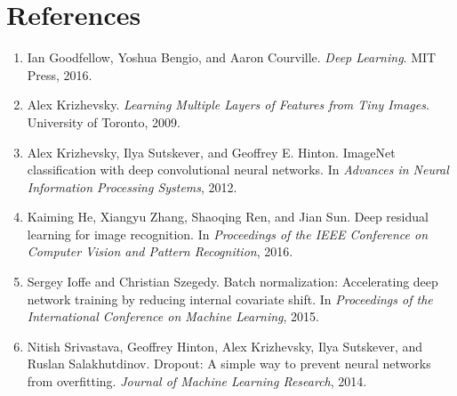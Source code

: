 \documentclass{article}
\begin{document}
\section*{References}

\begin{enumerate}
    \item Ian Goodfellow, Yoshua Bengio, and Aaron Courville. \emph{Deep Learning}. MIT Press, 2016.
    \item Alex Krizhevsky. \textit{Learning Multiple Layers of Features from Tiny Images}. University of Toronto, 2009.
    \item Alex Krizhevsky, Ilya Sutskever, and Geoffrey E. Hinton. ImageNet classification with deep convolutional neural networks. In \textit{Advances in Neural Information Processing Systems}, 2012.
    \item Kaiming He, Xiangyu Zhang, Shaoqing Ren, and Jian Sun. Deep residual learning for image recognition. In \textit{Proceedings of the IEEE Conference on Computer Vision and Pattern Recognition}, 2016.
    \item Sergey Ioffe and Christian Szegedy. Batch normalization: Accelerating deep network training by reducing internal covariate shift. In \textit{Proceedings of the International Conference on Machine Learning}, 2015.
    \item Nitish Srivastava, Geoffrey Hinton, Alex Krizhevsky, Ilya Sutskever, and Ruslan Salakhutdinov. Dropout: A simple way to prevent neural networks from overfitting. \textit{Journal of Machine Learning Research}, 2014.
\end{enumerate}
\end{document}
